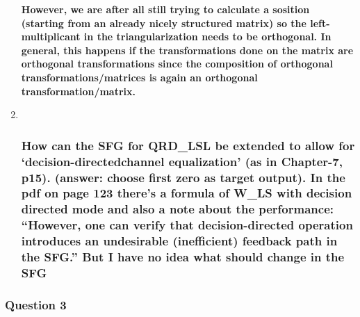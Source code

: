 \documentclass[
  a4paper,
  ,captions=tableheading
]{scrartcl}
\begin{document}
\begin{enumerate}
  \textbf{However, we are after all still trying to calculate a sosition
  (starting from an already nicely structured matrix) so the
  left-multiplicant in the triangularization needs to be orthogonal. In
  general, this happens if the transformations done on the matrix are
  orthogonal transformations since the composition of orthogonal
  transformations/matrices is again an orthogonal
  transformation/matrix.}
\item ~
  \subsubsection{How can the SFG for QRD\_LSL be extended to allow for
  `decision-directedchannel equalization' (as in Chapter-7, p15).
  (answer: choose first zero as target output). In the pdf on page 123
  there's a formula of W\_LS with decision directed mode and also a note
  about the performance: ``However, one can verify that
  decision-directed operation introduces an undesirable (inefficient)
  feedback path in the SFG.'' But I have no idea what should change in
  the
  SFG}\label{how-can-the-sfg-for-qrd_lsl-be-extended-to-allow-for-decision-directedchannel-equalization-as-in-chapter-7-p15.-answer-choose-first-zero-as-target-output.-in-the-pdf-on-page-123-theres-a-formula-of-w_ls-with-decision-directed-mode-and-also-a-note-about-the-performance-however-one-can-verify-that-decision-directed-operation-introduces-an-undesirable-inefficient-feedback-path-in-the-sfg.-but-i-have-no-idea-what-should-change-in-the-sfg}
\end{enumerate}

\subsubsection{Question 3}\label{question-3-2}
\end{document}
